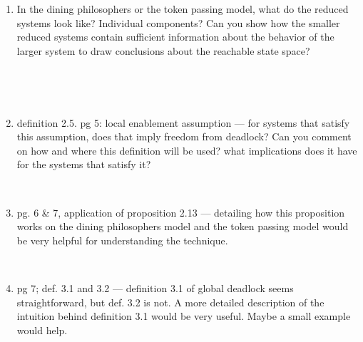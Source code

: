 \begin{enumerate}
~

\item In the dining philosophers or the token passing model, what do the reduced systems
look like? Individual components?  Can you show how the smaller reduced systems
contain sufficient information about the behavior of the larger system to draw conclusions
about the reachable state space?

~

~


\item  definition 2.5. pg 5:  local enablement assumption --- for systems 
  that satisfy
this assumption, does that imply freedom from deadlock?   
Can you comment on how and where
this definition will be used?  what implications does it have for 
the systems that satisfy it?

~


\item  pg. 6 \& 7, application of proposition 2.13 --- detailing how this proposition works
on the dining philosophers model and the token passing model would be very helpful
for understanding the technique.

~


\item pg 7; def. 3.1 and 3.2 --- definition 3.1 of global deadlock seems straightforward, but
def. 3.2 is not.  A more detailed description of the intuition behind definition 3.1 would
be very useful.  Maybe a small example would help.


\end{enumerate}
